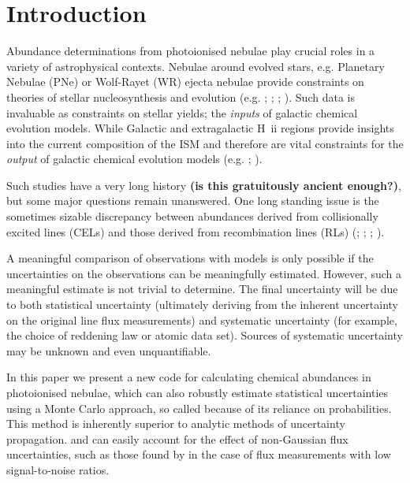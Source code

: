 \documentclass[useAMS,usenatbib]{mn2e}
\begin{document}
\section{Introduction}

Abundance determinations from photoionised nebulae play crucial roles in a variety of astrophysical contexts. Nebulae around evolved stars, e.g. Planetary Nebulae (PNe) or Wolf-Rayet (WR) ejecta nebulae provide constraints on theories of stellar nucleosynthesis and evolution (e.g. \citealt{2009ApJ...690.1130K};  \citealt{2011arXiv1110.1186M}; \citealt{1992A&A...264..105M}; \citealt{2011MNRAS.tmp.1754S}). Such data is invaluable as constraints on stellar yields; the \textit{inputs} of galactic chemical evolution models. While Galactic and extragalactic H~{\sc ii} regions provide insights into the current composition of the ISM and therefore are vital constraints for the \textit{output} of galactic chemical evolution models (e.g. \citealt{1997nceg.book.....P}; \citealt{2003ceg..book.....M}).

Such studies have a very long history \citep{1864RSPT..154..437H} \textbf{(is this gratuitously ancient enough?)}, but some major questions remain unanswered.  One long standing issue is the sometimes sizable discrepancy between abundances derived from collisionally excited lines (CELs) and those derived from recombination lines (RLs) (\citealt{2005MNRAS.362..424W}; \citet{2006MNRAS.368.1959L}; \citealt{2007ApJ...670..457G}; \citealt{2008MNRAS.386...22T}).

A meaningful comparison of observations with models is only possible if the uncertainties on the observations can be meaningfully estimated.  However, such a meaningful estimate is not trivial to determine.  The final uncertainty will be due to both statistical uncertainty (ultimately deriving from the inherent uncertainty on the original line flux measurements) and systematic uncertainty (for example, the choice of reddening law or atomic data set).  Sources of systematic uncertainty may be unknown and even unquantifiable.

In this paper we present a new code for calculating chemical abundances in photoionised nebulae, which can also robustly estimate statistical uncertainties using a Monte Carlo approach, so called because of its reliance on probabilities.  This method is inherently superior to analytic methods of uncertainty propagation. and can easily account for the effect of non-Gaussian flux uncertainties, such as those found by \citet{1994A&A...287..676R} in the case of flux measurements with low signal-to-noise ratios.
\end{document}
